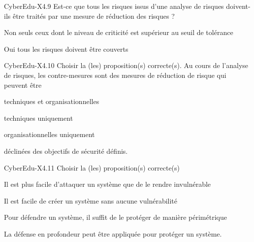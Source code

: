 \begin{multi}[multiple=true]{CyberEdu-X4.9}
Est-ce que tous les risques issus d'une analyse de risques doivent-ils être traités par une mesure de réduction des risques ?
\item* Non seuls ceux dont le niveau de criticité est supérieur au seuil de tolérance
\item Oui tous les risques doivent être couverts
\end{multi}
\begin{multi}[multiple=true]{CyberEdu-X4.10}
Choisir la (les) proposition(s) correcte(s). Au cours de l'analyse de risques, les contre-mesures sont des mesures de réduction de risque qui peuvent être 
\item*	techniques et organisationnelles 
\item	techniques uniquement 
\item	organisationnelles uniquement 
\item* déclinées des objectifs de sécurité définis.
\end{multi}
\begin{multi}[multiple=true]{CyberEdu-X4.11}
Choisir la (les) proposition(s) correcte(s) 
\item*	Il est plus facile d'attaquer un système que de le rendre invulnérable 
\item	Il est facile de créer un système sans aucune vulnérabilité 
\item	Pour défendre un système, il suffit de le protéger de manière périmétrique 
\item*	La défense en profondeur peut être appliquée pour protéger un système.
\end{multi}


